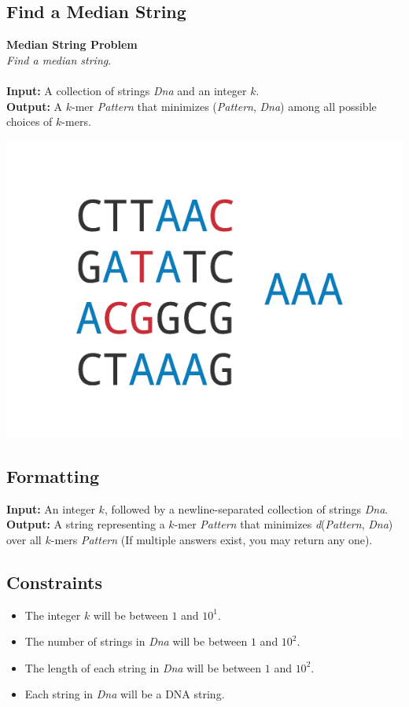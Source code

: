 \documentclass{article}
\renewcommand{\sc}[1]{\text{\scshape #1}}
\begin{document}
\subsection{Find a Median String}
\hline\vspace{5}
\noindent\textbf{Median String Problem}\\
\emph{Find a median string}.\\ \\
\textbf{Input:} A collection of strings \emph{Dna} and an integer $k$.\\
\textbf{Output:} A $k$-mer \emph{Pattern} that minimizes \sc{d}(\emph{Pattern}, \emph{Dna}) among all possible choices of $k$-mers.
\begin{center}
    \includegraphics[scale=0.24]{c2/logos/2B.png} 
\end{center}
\hline\vspace{5}

\subsection*{Formatting}
\textbf{Input:} An integer $k$, followed by a newline-separated collection of strings \emph{Dna}.\\
\noindent\textbf{Output:} A string representing a $k$-mer \emph{Pattern} that minimizes \emph{d}(\emph{Pattern}, \emph{Dna}) over all $k$-mers \emph{Pattern} (If multiple answers exist, you may return any one).

\subsection*{Constraints}
\begin{itemize}
    \item The integer $k$ will be between $1$ and $10^1$.
    \item The number of strings in \emph{Dna} will be between $1$ and $10^2$.
    \item The length of each string in \emph{Dna} will be between $1$ and $10^2$.
    \item Each string in \emph{Dna} will be a DNA string.
\end{itemize}
\pagebreak
\end{document}
